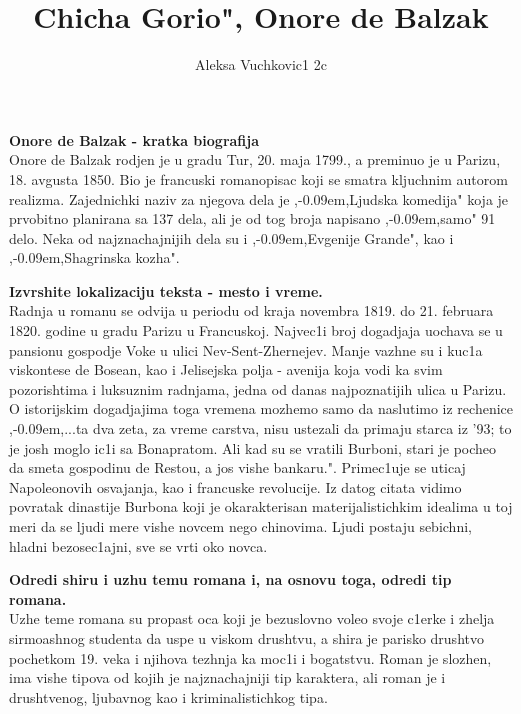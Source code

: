 \documentclass[11pt]{article}
\title{\bf{\zn Chicha Gorio", Onore de Balzak}}
\author{\Large Aleksa Vuchkovic1 2c}
\date{}
\def \zn{,\kern-0.09em,}
\begin{document}
\maketitle
\large
\begin{p}
\textbf{Onore de Balzak - kratka biografija}\\
Onore de Balzak rodjen je u gradu Tur, 20. maja 1799., a preminuo je u Parizu, 18. avgusta 1850. Bio je francuski romanopisac koji se smatra kljuchnim autorom realizma. Zajednichki naziv za njegova dela je \zn Ljudska komedija" koja je prvobitno planirana sa 137 dela, ali je od tog broja napisano \zn samo" 91 delo. Neka od najznachajnijih dela su i \zn Evgenije Grande", kao i \zn Shagrinska kozha".
\end{p}

\begin{p}
\textbf{Izvrshite lokalizaciju teksta - mesto i vreme.}\\
Radnja u romanu se odvija u periodu od kraja novembra 1819. do 21. februara 1820. godine u gradu Parizu u Francuskoj. Najvec1i broj dogadjaja uochava se u pansionu gospodje Voke u ulici Nev-Sent-Zhernejev. Manje vazhne su i kuc1a viskontese de Bosean, kao i Jelisejska polja - avenija koja vodi ka svim pozorishtima i luksuznim radnjama, jedna od danas najpoznatijih ulica u Parizu. O istorijskim dogadjajima toga vremena mozhemo samo da naslutimo iz rechenice \zn ...ta dva zeta, za vreme carstva, nisu ustezali da primaju starca iz '93; to je josh moglo ic1i sa Bonapratom. Ali kad su se vratili Burboni, stari je pocheo da smeta gospodinu de Restou, a jos vishe bankaru.". Primec1uje se uticaj Napoleonovih osvajanja, kao i francuske revolucije. Iz datog citata vidimo povratak dinastije Burbona koji je okarakterisan materijalistichkim idealima u toj meri da se ljudi mere vishe novcem nego chinovima. Ljudi postaju sebichni, hladni bezosec1ajni, sve se vrti oko novca.
\end{p}

\begin{p}
\textbf{Odredi shiru i uzhu temu romana i, na osnovu toga, odredi tip romana.}\\
Uzhe teme romana su propast oca koji je bezuslovno voleo svoje c1erke i zhelja sirmoashnog studenta da uspe u viskom drushtvu, a shira je parisko drushtvo pochetkom 19. veka i njihova tezhnja ka moc1i i bogat{}stvu. Roman je slozhen, ima vishe tipova od kojih je najznachajniji tip karaktera, ali roman je i drushtvenog, ljubavnog kao i kriminalistichkog tipa.
\end{p}
\end{document}
